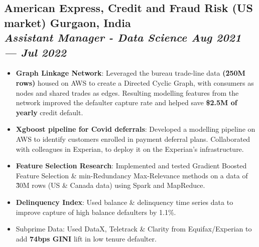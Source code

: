 \documentclass[a4,10pt]{article}
\newenvironment{zitemize}{
\begin{itemize}\itemsep0pt \parskip0pt \parsep1pt}
{\end{itemize}\vspace{-0.4cm}}
\begin{document}
\subsection*{\large American Express, Credit and Fraud Risk (US market) \hfill {\normalsize\normalfont Gurgaon, India \\{\textit{\textbf{Assistant Manager - Data Science} \hfill Aug 2021 --- Jul 2022}}}} 
\vspace{0.05cm}
    \begin{zitemize}
        \item \textbf{Graph Linkage Network}: Leveraged the bureau trade-line data \textbf{(\~250M rows)} housed on AWS to create a Directed Cyclic Graph, with consumers as nodes and shared trades as edges. Resulting modelling features from the network improved the defaulter capture rate and helped save \textbf{\$2.5M of yearly} credit default.
        \item \textbf{Xgboost pipeline for Covid deferrals}: Developed a modelling pipeline on AWS to identify customers enrolled in payment deferral plans. Collaborated with colleagues in Experian, to deploy it on the Experian's infrastructure.
        \item \textbf{Feature Selection Research}: Implemented and tested Gradient Boosted Feature Selection \& min-Redundancy Max-Relevance methods on a data of \~30M rows (US \& Canada data) using Spark and MapReduce. 
        \item \textbf{Delinquency Index}: Used balance \& delinquency time series data to improve capture of high balance defaulters by 1.1\%.
        \item Subprime Data: Used DataX, Teletrack \& Clarity from Equifax/Experian to add \textbf{74bps GINI} lift in low tenure defaulter.
    \end{zitemize}

\end{document}
